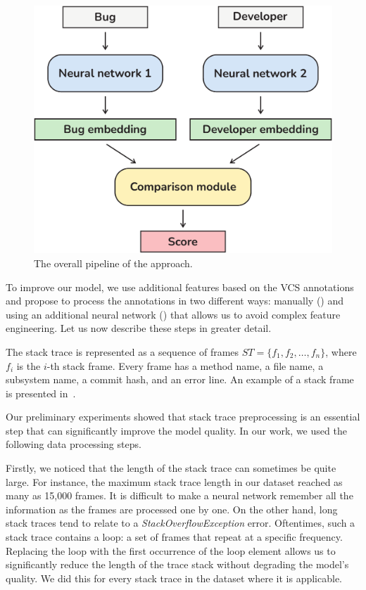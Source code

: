 \begin{figure}[t]
    \centering
    \includegraphics[width=0.7\columnwidth]{figures/03-approach/architecture.pdf}
    \centering
    \caption{The overall pipeline of the approach.}
    \label{fig:approach-architecture}
\end{figure}

To improve our model, we use additional features based on the VCS annotations and propose to process the annotations in two different ways: manually () and using an additional neural network () that allows us to avoid complex feature engineering. 
Let us now describe these steps in greater detail.

\label{sec:preprocessing}

The stack trace is represented as a sequence of frames $ST = \{ f_1, f_2, \ldots, f_n \}$, where $f_i$ is the $i$-th stack frame. Every frame has a method name, a file name, a subsystem name, a commit hash, and an error line. An example of a stack frame is presented in~.

Our preliminary experiments showed that stack trace preprocessing is an essential step that can significantly improve the model quality. In our work, we used the following data processing steps.

Firstly, we noticed that the length of the stack trace can sometimes be quite large. For instance, the maximum stack trace length in our dataset reached as many as 15,000 frames. It is difficult to make a neural network remember all the information as the frames are processed one by one. On the other hand, long stack traces tend to relate to a \textit{StackOverflowException} error. Oftentimes, such a stack trace contains a loop: a set of frames that repeat at a specific frequency. Replacing the loop with the first occurrence of the loop element allows us to significantly reduce the length of the trace stack without degrading the model's quality. We did this for every stack trace in the dataset where it is applicable.

